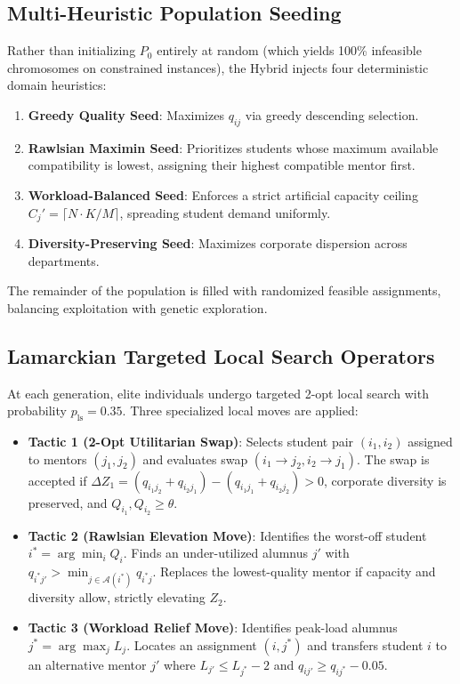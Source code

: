 \subsection{Multi-Heuristic Population Seeding}
Rather than initializing $P_0$ entirely at random (which yields 100\% infeasible chromosomes on constrained instances), the Hybrid injects four deterministic domain heuristics:
\begin{enumerate}
    \item \textbf{Greedy Quality Seed}: Maximizes $q_{ij}$ via greedy descending selection.
    \item \textbf{Rawlsian Maximin Seed}: Prioritizes students whose maximum available compatibility is lowest, assigning their highest compatible mentor first.
    \item \textbf{Workload-Balanced Seed}: Enforces a strict artificial capacity ceiling $C_j' = \lceil N \cdot K / M \rceil$, spreading student demand uniformly.
    \item \textbf{Diversity-Preserving Seed}: Maximizes corporate dispersion across departments.
\end{enumerate}
The remainder of the population is filled with randomized feasible assignments, balancing exploitation with genetic exploration.

\subsection{Lamarckian Targeted Local Search Operators}
At each generation, elite individuals undergo targeted 2-opt local search with probability $p_{\text{ls}} = 0.35$. Three specialized local moves are applied:
\begin{itemize}
    \item \textbf{Tactic 1 (2-Opt Utilitarian Swap)}: Selects student pair $(i_1, i_2)$ assigned to mentors $(j_1, j_2)$ and evaluates swap $(i_1 \to j_2, i_2 \to j_1)$. The swap is accepted if $\Delta Z_1 = (q_{i_1 j_2} + q_{i_2 j_1}) - (q_{i_1 j_1} + q_{i_2 j_2}) > 0$, corporate diversity is preserved, and $Q_{i_1}, Q_{i_2} \ge \theta$.
    \item \textbf{Tactic 2 (Rawlsian Elevation Move)}: Identifies the worst-off student $i^* = \arg\min_i Q_i$. Finds an under-utilized alumnus $j'$ with $q_{i^* j'} > \min_{j \in \mathcal{A}(i^*)} q_{i^* j}$. Replaces the lowest-quality mentor if capacity and diversity allow, strictly elevating $Z_2$.
    \item \textbf{Tactic 3 (Workload Relief Move)}: Identifies peak-load alumnus $j^* = \arg\max_j L_j$. Locates an assignment $(i, j^*)$ and transfers student $i$ to an alternative mentor $j'$ where $L_{j'} \le L_{j^*} - 2$ and $q_{i j'} \ge q_{i j^*} - 0.05$.
\end{itemize}


